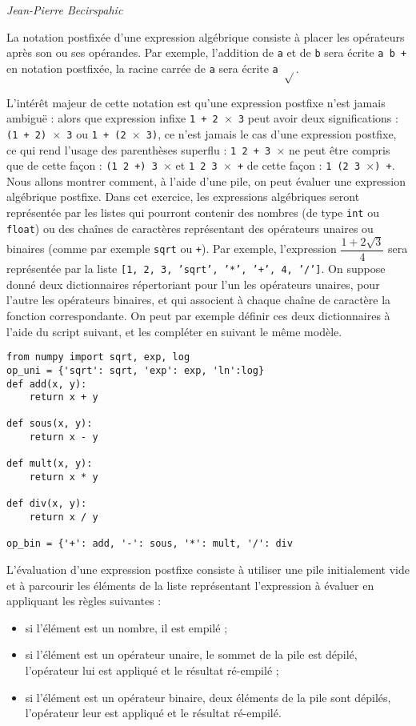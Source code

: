 
\begin{flushright}
\textit{Jean-Pierre Becirspahic}
\end{flushright}

La notation postfixée d’une expression algébrique consiste à placer les opérateurs après son ou ses opérandes. Par
exemple, l’addition de \texttt{a} et de \texttt{b} sera écrite \texttt{a b +} en notation postfixée, la racine carrée de \texttt{a} sera écrite \texttt{a
 $\sqrt{}$}.
 
L’intérêt majeur de cette notation est qu’une expression postfixe n’est jamais ambiguë : alors que expression
infixe \texttt{1 + 2 $\times$ 3} peut avoir deux significations : \texttt{(1 + 2) 
$\times$ 3} ou \texttt{1 + (2 $\times$ 3)}, ce n’est jamais le cas d’une
expression postfixe, ce qui rend l’usage des parenthèses superflu : \texttt{1 2 + 3 $\times$} ne peut être compris que de cette
façon : \texttt{(1 2 +) 3 $\times$} et \texttt{1 2 3 $\times$ +} de cette façon : \texttt{1 (2 3 $\times$) +}.
Nous allons montrer comment, à l’aide d’une pile, on peut évaluer une expression algébrique postfixe.
Dans cet exercice, les expressions algébriques seront représentée par les listes qui pourront contenir des nombres
(de type \texttt{int} ou \texttt{float}) ou des chaînes de caractères représentant des opérateurs unaires ou binaires (comme par
exemple \texttt{sqrt} ou \texttt{+}).
Par exemple, l’expression  $\dfrac{1+2\sqrt{3}}{4}$ sera représentée par la liste \texttt{[1, 2, 3, 'sqrt', '*', '+', 4, '/']}.
On suppose donné deux dictionnaires répertoriant pour l’un les opérateurs unaires, pour l’autre les opérateurs
binaires, et qui associent à chaque chaîne de caractère la fonction correspondante. On peut par exemple définir
ces deux dictionnaires à l’aide du script suivant, et les compléter en suivant le même modèle.

\begin{lstlisting}
from numpy import sqrt, exp, log
op_uni = {'sqrt': sqrt, 'exp': exp, 'ln':log}
def add(x, y):
    return x + y
    
def sous(x, y):
    return x - y
    
def mult(x, y):
    return x * y
    
def div(x, y):
    return x / y

op_bin = {'+': add, '-': sous, '*': mult, '/': div
\end{lstlisting}


L’évaluation d’une expression postfixe consiste à utiliser une pile initialement vide et à parcourir les éléments
de la liste représentant l’expression à évaluer en appliquant les règles suivantes :
\begin{itemize}
\item si l’élément est un nombre, il est empilé ;
\item si l’élément est un opérateur unaire, le sommet de la pile est dépilé, l’opérateur lui est appliqué et le
résultat ré-empilé ;
\item si l’élément est un opérateur binaire, deux éléments de la pile sont dépilés, l’opérateur leur est appliqué
et le résultat ré-empilé.
\end{itemize}

